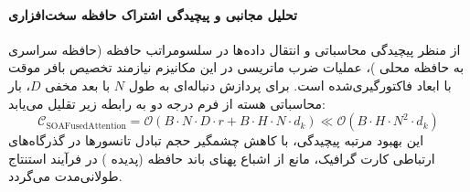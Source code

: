 \paragraph{تحلیل مجانبی و پیچیدگی اشتراک حافظه سخت‌افزاری}
از منظر پیچیدگی محاسباتی و انتقال داده‌ها در سلسومراتب حافظه (حافظه سراسری  به حافظه محلی )، عملیات ضرب ماتریسی در این مکانیزم نیازمند تخصیص بافر موقت با ابعاد فاکتورگیری‌شده است. برای پردازش دنباله‌ای به طول $N$ با بعد مخفی $D$، بار محاسباتی هسته از فرم درجه دو به رابطه زیر تقلیل می‌یابد:
\begin{equation}
\label{eq:complexity_SOAFusedAttention}
\mathcal{C}_{\text{SOAFusedAttention}} = \mathcal{O}\left( B \cdot N \cdot D \cdot r + B \cdot H \cdot N \cdot d_k \right) \ll \mathcal{O}\left( B \cdot H \cdot N^2 \cdot d_k \right)
\end{equation}
این بهبود مرتبه پیچیدگی، با کاهش چشمگیر حجم تبادل تانسورها در گذرگاه‌های ارتباطی کارت گرافیک، مانع از اشباع پهنای باند حافظه (پدیده ) در فرآیند استنتاج طولانی‌مدت می‌گردد.